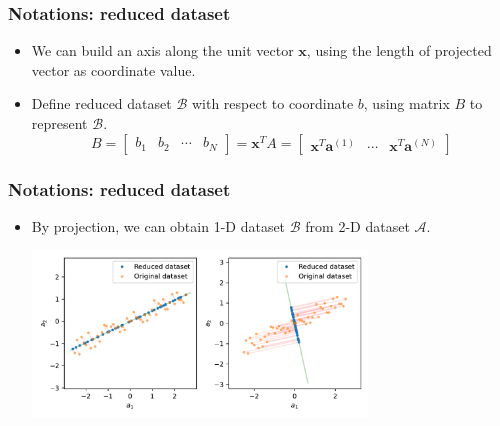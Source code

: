 \documentclass[serif]{beamer}
\begin{document}
\begin{frame}
    \frametitle{Notations: reduced dataset}
    \begin{itemize}
        \item We can build an axis along the unit vector $\mathbf{x}$, using the length of projected vector as coordinate value.
        \begin{center}
        \end{center}
        \item Define \alert{reduced dataset} $\mathcal{B}$ with respect to coordinate $b$, using matrix $B$ to represent $\mathcal{B}$.
        $$
        B = \begin{bmatrix}
            b_1 & b_2 &\cdots & b_N
        \end{bmatrix} = \mathbf{x}^T A = 
        \begin{bmatrix}
            \mathbf{x}^T\mathbf{a}^{(1)} & \cdots & \mathbf{x}^T\mathbf{a}^{(N)}
        \end{bmatrix}
        $$
    \end{itemize}
\end{frame}

\begin{frame}
    \frametitle{Notations: reduced dataset}
    \begin{itemize}
        \item By projection, we can obtain 1-D dataset $\mathcal{B}$ from 2-D dataset $\mathcal{A}$.
        \begin{center}
            \includegraphics[width=3.5in]{./proj12.pdf}
        \end{center}
    \end{itemize}
\end{frame}
\end{document}
